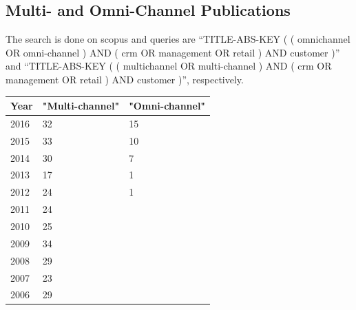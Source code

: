 \subsection{Multi- and Omni-Channel Publications}
\label{app:mcoc}
The search is done on scopus and queries are \enquote{TITLE-ABS-KEY ( ( omnichannel  OR  omni-channel )  AND  ( crm  OR  management  OR  retail )  AND  customer )} and \enquote{TITLE-ABS-KEY ( ( multichannel  OR  multi-channel )  AND  ( crm  OR  management  OR  retail )  AND  customer )}, respectively.

\begin{table}[caption={Multi- and Omni-Channel Publication Comparison}, label=tab:crmnotioncomparison]
	\centering
	\begin{tabular}{p{1cm}| p{4cm} |p{4cm}    } 
	\textbf{Year} & \textbf{"Multi-channel"} & \textbf{"Omni-channel"} \\ \hline 
	2016          & 32            & 15                                                                       \\
	2015          & 33            & 10                                                                   \\
	2014          & 30            & 7                                                                   \\
	2013          & 17            & 1                                                           \\
	2012          & 24            & 1                                                              \\
	2011          & 24            &                                                       \\
	2010          & 25            &                                                                \\
	2009          & 34            &                                                       \\
	2008          & 29             &                                             \\
	2007          & 23            &                                                       \\
	2006 & 29         &                           					 \\
\end{tabular}
\end{table}

